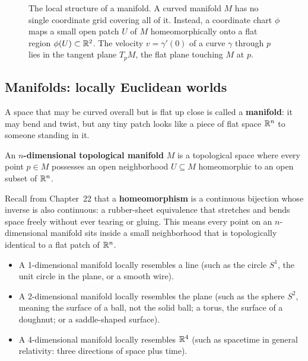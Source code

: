 \begin{figure}[htbp]
\caption{The local structure of a manifold. A curved manifold $M$ has no single coordinate grid covering all of it. Instead, a coordinate chart $\phi$ maps a small open patch $U$ of $M$ homeomorphically onto a flat region $\phi(U) \subset \mathbb{R}^2$. The velocity $v = \gamma'(0)$ of a curve $\gamma$ through $p$ lies in the tangent plane $T_p M$, the flat plane touching $M$ at $p$.}\label{23:fig-chart-tangent}
\end{figure}

\subsection{Manifolds: locally Euclidean worlds}

A space that may be curved overall but is flat up close is called a \textbf{manifold}: it may bend and twist, but any tiny patch looks like a piece of flat space $\mathbb{R}^n$ to someone standing in it.

\begin{definition}
An \textbf{$n$-dimensional topological manifold} $M$ is a topological space where every point $p \in M$ possesses an open neighborhood $U \subseteq M$ homeomorphic to an open subset of $\mathbb{R}^n$.
\end{definition}

Recall from Chapter~22 that a \textbf{homeomorphism} is a continuous bijection whose inverse is also continuous: a rubber-sheet equivalence that stretches and bends space freely without ever tearing or gluing. This means every point on an $n$-dimensional manifold sits inside a small neighborhood that is topologically identical to a flat patch of $\mathbb{R}^n$.
\begin{itemize}
\item A 1-dimensional manifold locally resembles a line (such as the circle $S^1$, the unit circle in the plane, or a smooth wire).
\item A 2-dimensional manifold locally resembles the plane (such as the sphere $S^2$, meaning the surface of a ball, not the solid ball; a torus, the surface of a doughnut; or a saddle-shaped surface).
\item A 4-dimensional manifold locally resembles $\mathbb{R}^4$ (such as spacetime in general relativity: three directions of space plus time).
\end{itemize}

